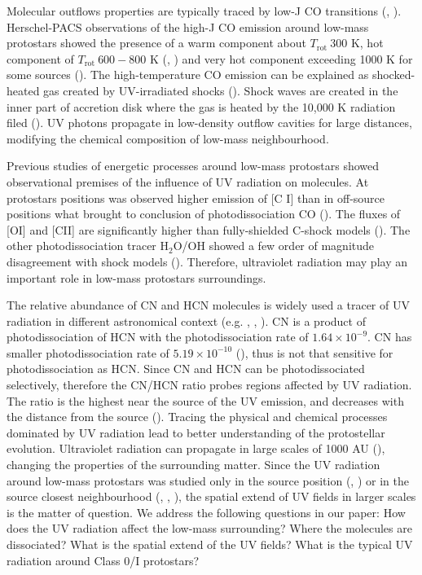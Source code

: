 \documentclass{aa}
\begin{document}
Molecular outflows properties are typically traced by low-J CO transitions (\cite{Bon96}, \cite{Dun14}). Herschel-PACS observations of the high-J CO emission around low-mass protostars showed the presence of a warm component about $T_\mathrm{rot} ~ 300$  K, hot component of $T_\mathrm{rot} ~ 600-800$  K (\cite{Kar13}, \cite{Gre13}) and very hot component exceeding 1000 K for some sources (\cite{Man13}). The high-temperature CO emission can be explained as shocked-heated gas created by UV-irradiated shocks (\cite{Kri17}). Shock waves are created in the inner part of accretion disk where the gas is heated by the 10,000 K radiation filed (\cite{Spa95}). UV photons propagate in low-density outflow cavities for large distances, modifying the chemical composition of low-mass neighbourhood. 

Previous studies of energetic processes around low-mass protostars showed observational premises of the influence of UV radiation on molecules. At protostars positions was observed higher emission of [C I] than in off-source positions what brought to conclusion of photodissociation CO (\cite{vKe09}). The fluxes of [OI] and [CII] are significantly higher than fully-shielded C-shock models (\cite{Kar18}). The other photodissociation tracer H$_2$O/OH showed a few order of magnitude disagreement with shock models (\cite{Kar14}). Therefore, ultraviolet radiation may play an important role in low-mass protostars surroundings. 

The relative abundance of CN and HCN molecules is widely used a tracer of UV radiation in different astronomical context (e.g. \cite{Fue95}, \cite{Cha12}, \cite{Ria18}). CN is a product of photodissociation of HCN with the photodissociation rate of $1.64\times10^{-9}$. CN has smaller photodissociation rate of $5.19\times10^{-10}$ (\cite{Hea17}), thus is not that sensitive for photodissociation as HCN. Since CN and HCN can be photodissociated selectively, therefore the CN/HCN ratio probes regions affected by UV radiation. The ratio is the highest near the source of the UV emission, and decreases with the distance from the source (\cite{Fue93}). 
Tracing the physical and chemical processes dominated by UV radiation lead to better understanding of the protostellar evolution. Ultraviolet radiation can propagate in large scales of 1000 AU (\cite{Kri17}), changing the properties of the surrounding matter. Since the UV radiation around low-mass protostars was studied only in the source position (\cite{Sta07}, \cite{Ria18}) or in the source closest neighbourhood (\cite{Hog99}, \cite{Bac01}, \cite{Jor04}), the spatial extend of UV fields in larger scales is the matter of question. We address the following questions in our paper: How does the UV radiation affect the low-mass surrounding? Where the molecules are dissociated? What is the spatial extend of the UV fields? What is the typical UV radiation around Class 0/I protostars?  
\end{document}

